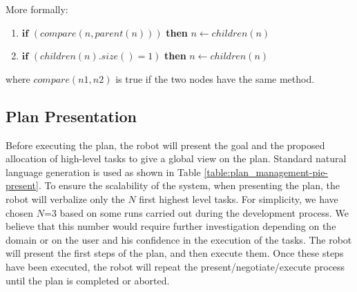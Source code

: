 More formally:
\begin{enumerate}
\item $\textbf{if}$ $(compare(n, parent(n)))$ \textbf{then} $n \leftarrow children(n)$
\item $\textbf{if}$ $(children(n).size() = 1)$ \textbf{then} $n \leftarrow children(n)$
\end{enumerate}

where $compare(n1,n2)$ is true if the two nodes have the same method.

\subsection{Plan Presentation}
Before executing the plan, the robot will present the goal and the proposed allocation of high-level tasks to give a global view on the plan. Standard natural language generation is used as shown in Table \ref{table:plan_management-pie-present}. 
To ensure the scalability of the system, when presenting the plan, the robot will verbalize only the $N$ first highest level tasks. For simplicity, we have chosen $N$=$3$ based on some runs carried out during the development process. We believe that this number would require further investigation depending on the domain or on the user and his confidence in the execution of the tasks. The robot will present the first steps of the plan, and then execute them. Once these steps have been executed, the robot will repeat the present/negotiate/execute process until the plan is completed or aborted.



 
